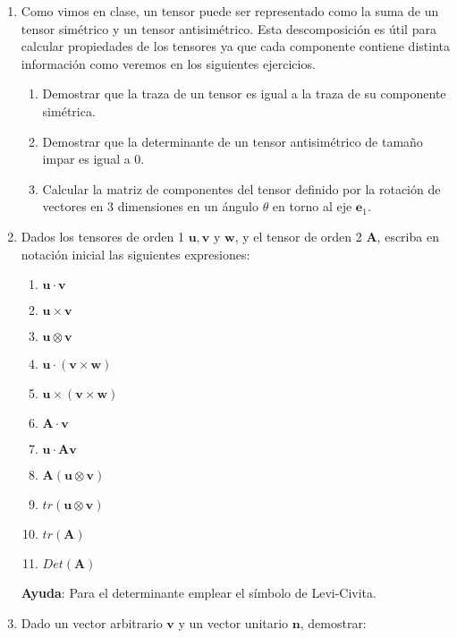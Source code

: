 \documentclass[12pt,a4paper]{article}
\title{\mathbf{Mécanica de Medios Continuos \\Practica 0 \\ Álgebra y cálculo vectorial y tensorial}}
\author{Universidad de Cuenca}
\begin{document}
\maketitle
\begin{enumerate}
    \item Como vimos en clase, un tensor puede ser representado como la suma de un tensor simétrico y un tensor antisimétrico. 
    Esta descomposición es útil para calcular propiedades de los tensores ya que cada componente contiene distinta información como veremos en los siguientes ejercicios.
    \begin{enumerate}
        \item Demostrar que la traza de un tensor es igual a la traza de su componente simétrica.
        \item Demostrar que la determinante de un tensor antisimétrico de tamaño impar es igual a 0.
        \item Calcular la matriz de componentes del tensor definido por la rotación de vectores en 3 dimensiones en un ángulo $\theta$ en torno al eje $\mathbf{e}_1$.
    \end{enumerate}
    \item Dados los tensores de orden 1 $\mathbf{u}, \mathbf{v}$ y $\mathbf{w}$, y el tensor de orden 2 $\mathbf{A}$, 
    escriba en notación inicial las siguientes expresiones:
    \begin{enumerate}
        \item $\mathbf{u} \cdot \mathbf{v}$
        \item $\mathbf{u} \times \mathbf{v}$
        \item $\mathbf{u} \otimes \mathbf{v}$
        \item $\mathbf{u} \cdot (\mathbf{v}\times \mathbf{w})$
        \item $\mathbf{u} \times( \mathbf{v}\times \mathbf{w})$
        \item $\mathbf{A} \cdot \mathbf{v}$
        \item $\mathbf{u} \cdot \mathbf{A} \mathbf{v}$
        \item $\mathbf{A}  (\mathbf{u}\otimes\mathbf{v})$
        \item $tr(\mathbf{u} \otimes \mathbf{v})$
        \item $tr(\mathbf{A})$
        \item $Det(\mathbf{A})$
    \end{enumerate}
    \textbf{Ayuda}: Para el determinante emplear el símbolo de Levi-Civita.  
    \item Dado un vector arbitrario $\mathbf{v}$ y un vector unitario $\mathbf{n}$, demostrar:

\end{enumerate}
\end{document}
